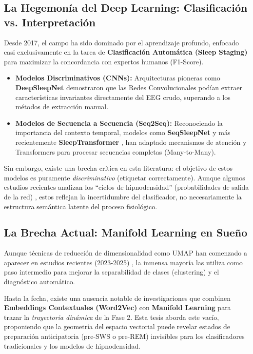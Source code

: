 \subsection{La Hegemonía del Deep Learning: Clasificación vs. Interpretación}
Desde 2017, el campo ha sido dominado por el aprendizaje profundo, enfocado casi exclusivamente en la tarea de \textbf{Clasificación Automática (Sleep Staging)} para maximizar la concordancia con expertos humanos (F1-Score).

\begin{itemize}
    \item \textbf{Modelos Discriminativos (CNNs):} Arquitecturas pioneras como \textbf{DeepSleepNet} \cite{supratak2017deepsleepnet} demostraron que las Redes Convolucionales podían extraer características invariantes directamente del EEG crudo, superando a los métodos de extracción manual.
    
    \item \textbf{Modelos de Secuencia a Secuencia (Seq2Seq):} Reconociendo la importancia del contexto temporal, modelos como \textbf{SeqSleepNet} \cite{phan2019seqsleepnet} y más recientemente \textbf{SleepTransformer} \cite{phan2022sleeptransformer}, han adaptado mecanismos de atención y Transformers para procesar secuencias completas (Many-to-Many).
\end{itemize}

Sin embargo, existe una brecha crítica en esta literatura: el objetivo de estos modelos es puramente \textit{discriminativo} (etiquetar correctamente). Aunque algunos estudios recientes analizan los ``ciclos de hipnodensidad'' (probabilidades de salida de la red) \cite{stephansen2018neural}, estos reflejan la incertidumbre del clasificador, no necesariamente la estructura semántica latente del proceso fisiológico.

\subsection{La Brecha Actual: Manifold Learning en Sueño}
Aunque técnicas de reducción de dimensionalidad como UMAP han comenzado a aparecer en estudios recientes (2023-2025) \cite{deng2024umap}, la inmensa mayoría las utiliza como paso intermedio para mejorar la separabilidad de clases (clustering) y el diagnóstico automático.

Hasta la fecha, existe una ausencia notable de investigaciones que combinen \textbf{Embeddings Contextuales (Word2Vec)} con \textbf{Manifold Learning} para trazar la \textit{trayectoria dinámica} de la Fase 2. Esta tesis aborda este vacío, proponiendo que la geometría del espacio vectorial puede revelar estados de preparación anticipatoria (pre-SWS o pre-REM) invisibles para los clasificadores tradicionales y los modelos de hipnodensidad.

